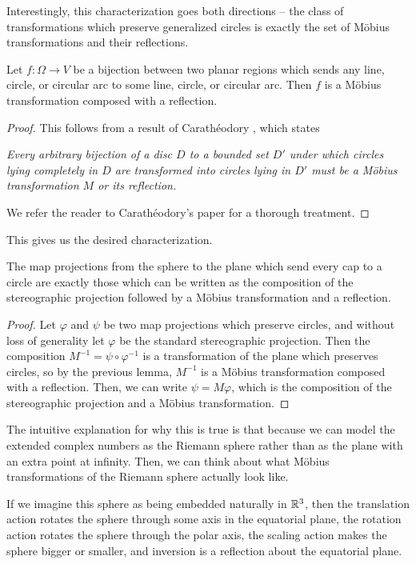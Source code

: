 Interestingly, this characterization goes both directions -- the class of transformations which preserve generalized circles is exactly the set of M\"obius transformations and their reflections.





\begin{lemma}
  Let $f:\Omega\to V$ be a bijection between two planar regions 
  which sends any line, circle, or circular arc to some line, circle, or circular arc. 
  Then $f$ is a M\"{o}bius transformation composed with a 
  reflection.
\end{lemma}
\begin{proof}
	
This follows from a result of
Carath\'{e}odory \cite{caratheodory}, which states

\begin{displayquote}
\textit{  Every arbitrary bijection of a disc $D$ to a bounded set $D'$ under which
  circles lying completely in $D$ are transformed into circles 
  lying in $D'$ must be a M\"obius transformation $M$ or its reflection.
}
\end{displayquote}

We refer the reader to Carath\'{e}odory's paper for a thorough treatment.

\end{proof}

This gives us the desired characterization.  


\begin{theorem}\label{thm:stereographic_mobius}
  The map projections from the sphere to the plane which send every
  cap to a circle are exactly those which can be written as the
  composition of the stereographic projection followed by a 
  M\"{o}bius transformation and a reflection.
\end{theorem}
\begin{proof}
  Let $\varphi$ and $\psi$ be two map projections which preserve
  circles, and without loss of generality let $\varphi$ be the
  standard stereographic projection.  Then the composition
  $M^{-1}=\psi\circ\varphi^{-1}$ is a transformation of 
  the plane which preserves circles, so by the previous lemma, 
  $M^{-1}$ is a M\"{o}bius transformation composed with a reflection. 
  Then, we can write $\psi= M\varphi$, which is the
  composition of the stereographic projection and a M\"obius transformation.
\end{proof}



The intuitive explanation for why this is true is that because we can model the extended complex numbers as the Riemann sphere rather than as the plane with an extra point at infinity.  Then, we can think about what M\"obius transformations of the Riemann sphere actually look like.  

If we imagine this sphere as being embedded naturally in $\mathbb{R}^3$, then the translation action rotates the sphere through some axis in the equatorial plane, the rotation action rotates the sphere through the polar axis, the scaling action makes the sphere bigger or smaller, and inversion is a reflection about the equatorial plane. 
